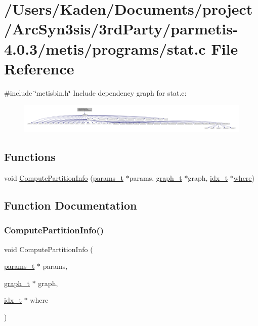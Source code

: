 \hypertarget{a00966}{}\section{/\+Users/\+Kaden/\+Documents/project/\+Arc\+Syn3sis/3rd\+Party/parmetis-\/4.0.3/metis/programs/stat.c File Reference}
\label{a00966}
{\ttfamily \#include \char`\"{}metisbin.\+h\char`\"{}}\newline
Include dependency graph for stat.\+c\+:\nopagebreak
\begin{figure}[H]
\begin{center}
\leavevmode
\includegraphics[width=350pt]{a00967}
\end{center}
\end{figure}
\subsection*{Functions}
\begin{DoxyCompactItemize}
\item 
void \hyperlink{a00966_a16087d53e4f04771ed2ffbd810711cba}{Compute\+Partition\+Info} (\hyperlink{a00706}{params\+\_\+t} $\ast$params, \hyperlink{a00734}{graph\+\_\+t} $\ast$graph, \hyperlink{a00876_aaa5262be3e700770163401acb0150f52}{idx\+\_\+t} $\ast$\hyperlink{a00879_a7a355801f721e9d8d4ae03590a3a56b0}{where})
\end{DoxyCompactItemize}


\subsection{Function Documentation}
\mbox{\label{a00966_a16087d53e4f04771ed2ffbd810711cba}} 
\subsubsection{\texorpdfstring{Compute\+Partition\+Info()}{ComputePartitionInfo()}}
{\footnotesize\ttfamily void Compute\+Partition\+Info (\begin{DoxyParamCaption}\item[{\hyperlink{a00706}{params\+\_\+t} $\ast$}]{params,  }\item[{\hyperlink{a00734}{graph\+\_\+t} $\ast$}]{graph,  }\item[{\hyperlink{a00876_aaa5262be3e700770163401acb0150f52}{idx\+\_\+t} $\ast$}]{where }\end{DoxyParamCaption})}

